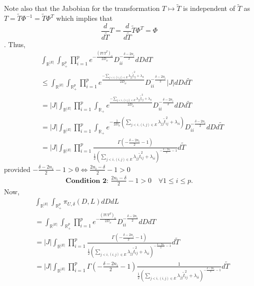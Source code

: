 \documentclass[12pt, leqno]{article}
\providecommand{\abs}[1]{\lvert#1\rvert}
\begin{document}
Note also that the Jabobian for the transformation $T \mapsto
\tilde{T}$ is independent of $\tilde{T}$ as $T = \tilde{T} \Phi^{-1} =
\tilde{T} \Phi^{T} 
$ which implies that 
\[\frac{d}{d\tilde{T}}T  = \frac{d}{d\tilde{T}} \tilde{T} \Phi^{T}  =
\Phi\].
Thus,
\begin{align*}
& \int_{\mathbb{R}^{\abs{E}}} \int_{\mathbb{R}_{+}^{p}} \prod_{i=1}^p e^{-\frac{(TUT^T)_{ii}
  }{2D_{ii}}}D_{ii}^{-\frac{\delta-2n_i}{2}} dD dT \\ &\leq
                                                  \int_{\mathbb{R}^{\abs{E}}}
                                                  \int_{\mathbb{R}_{+}^{p}} \prod_{i=1}^p e^{\frac{-\sum_{j<i,(i,j) \in E}\lambda_{jj}
                \tilde{t}_{ij}^2 + \lambda_{ii}}{2D_{ii}}} D_{ii}^{-\frac{\delta-2n_i}{2}} \abs{J}
                                                 dD d\tilde{T}  \\
& =  \abs{J} \int_{\mathbb{R}^{\abs{E}}} \prod_{i=1}^p  \int_{\mathbb{R}_{+}} e^{\frac{-\sum_{j<i,(i,j) \in E}\lambda_{jj}
                \tilde{t}_{ij}^2 + \lambda_{ii}}{2D_{ii}}} D_{ii}^{-\frac{\delta-2n_i}{2}}
  dD d\tilde{T} \\
& =  \abs{J} \int_{\mathbb{R}^{\abs{E}}}\prod_{i=1}^p  \int_{\mathbb{R}_{+}} e^{-\frac{1}{2D_{ii}}(\sum_{j<i,(i,j) \in E}\lambda_{jj}
                \tilde{t}_{ij}^2 + \lambda_{ii})} D_{ii}^{-\frac{\delta-2n_i}{2}}
  dD d\tilde{T} \\
&= \abs{J} \int_{\mathbb{R}^{\abs{E}}} \prod_{i=1}^p \frac{\Gamma(-\frac{\delta-2n_i}{2}-1)}{\frac{1}{2}(\sum_{j<i,(i,j) \in E}\lambda_{jj}
                \tilde{t}_{ij}^2 +
  \lambda_{ii})^{-\frac{\delta-2n_i}{2}-1}} d\tilde{T}
\end{align*}
provided $-\frac{\delta-2n_i}{2} - 1 > 0 \iff \frac{2n_i-\delta}{2} - 1 > 0$
\begin{align*}
\textbf{Condition 2: } \frac{2n_i-\delta}{2} - 1 > 0 \quad \forall 1 \leq i \leq p.
\end{align*}
Now, 
\begin{align*}
&\int_{\mathbb{R}^{\abs{E}}} \int_{\mathbb{R}_{+}^{p}} \pi_{U,\delta}(D,L)
  dD dL \\
&=\int_{\mathbb{R}^{\abs{E}}} \int_{\mathbb{R}_{+}^{p}} \prod_{i=1}^p e^{-\frac{(TUT^T)_{ii}
  }{2D_{ii}}}D_{ii}^{-\frac{\delta-2n_i}{2}} dD dT \\
&= \abs{J} \int_{\mathbb{R}^{\abs{E}}} \prod_{i=1}^p \frac{\Gamma(-\frac{\delta-2n_i}{2}-1)}{\frac{1}{2}(\sum_{j<i,(i,j) \in E}\lambda_{jj}
                \tilde{t}_{ij}^2 +
  \lambda_{ii})^{-\frac{\delta-2n_i}{2}-1}} d\tilde{T} \\
&= \abs{J} \int_{\mathbb{R}^{\abs{E}}} \prod_{i=1}^p  \Gamma(-\frac{\delta-2n_i}{2}-1) \frac{1}{\frac{1}{2}(\sum_{j<i,(i,j) \in E}\lambda_{jj}
                \tilde{t}_{ij}^2 +
  \lambda_{ii})^{-\frac{\delta-2n_i}{2}-1}} d\tilde{T}
\end{align*}
\end{document}
